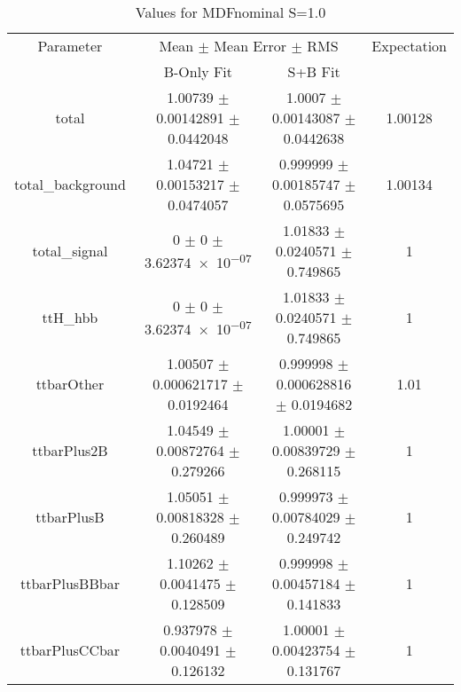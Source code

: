 \begin{table}
\centering
\caption{Values for MDFnominal S=1.0}
\begin{tabular}{cccc}
\toprule
Parameter & \multicolumn{2}{c}{Mean $\pm$ Mean Error $\pm$ RMS} & Expectation\\
 & B-Only Fit & S+B Fit & \\
\midrule
total & \num{1.00739} $\pm$ \num{0.00142891} $\pm$ \num{0.0442048} & \num{1.0007} $\pm$ \num{0.00143087} $\pm$ \num{0.0442638} & \num{1.00128}\\
total\_background & \num{1.04721} $\pm$ \num{0.00153217} $\pm$ \num{0.0474057} & \num{0.999999} $\pm$ \num{0.00185747} $\pm$ \num{0.0575695} & \num{1.00134}\\
total\_signal & \num{0} $\pm$ \num{0} $\pm$ \num{3.62374e-07} & \num{1.01833} $\pm$ \num{0.0240571} $\pm$ \num{0.749865} & \num{1}\\
ttH\_hbb & \num{0} $\pm$ \num{0} $\pm$ \num{3.62374e-07} & \num{1.01833} $\pm$ \num{0.0240571} $\pm$ \num{0.749865} & \num{1}\\
ttbarOther & \num{1.00507} $\pm$ \num{0.000621717} $\pm$ \num{0.0192464} & \num{0.999998} $\pm$ \num{0.000628816} $\pm$ \num{0.0194682} & \num{1.01}\\
ttbarPlus2B & \num{1.04549} $\pm$ \num{0.00872764} $\pm$ \num{0.279266} & \num{1.00001} $\pm$ \num{0.00839729} $\pm$ \num{0.268115} & \num{1}\\
ttbarPlusB & \num{1.05051} $\pm$ \num{0.00818328} $\pm$ \num{0.260489} & \num{0.999973} $\pm$ \num{0.00784029} $\pm$ \num{0.249742} & \num{1}\\
ttbarPlusBBbar & \num{1.10262} $\pm$ \num{0.0041475} $\pm$ \num{0.128509} & \num{0.999998} $\pm$ \num{0.00457184} $\pm$ \num{0.141833} & \num{1}\\
ttbarPlusCCbar & \num{0.937978} $\pm$ \num{0.0040491} $\pm$ \num{0.126132} & \num{1.00001} $\pm$ \num{0.00423754} $\pm$ \num{0.131767} & \num{1}\\
\bottomrule
\end{tabular}
\end{table}